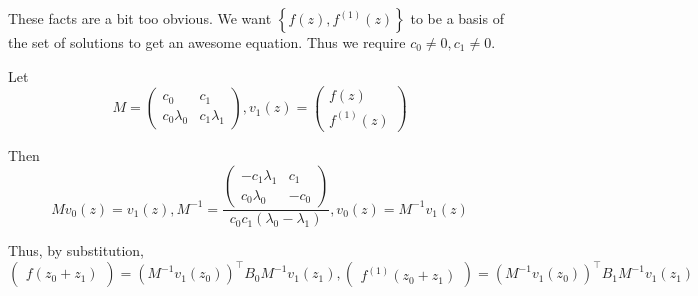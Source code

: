\documentclass[]{article}
\newcommand{\pqty}[1]{{\left(#1\right)}}
\newcommand{\Bqty}[1]{{\left\{#1\right\}}}
\numberwithin{equation}{section}
\begin{document}
	These facts are a bit too obvious. We want $\Bqty{f\pqty{z},f^\pqty{1}\pqty{z}}$ to be a basis of the set of solutions to get an awesome equation. Thus we require $c_0\neq 0,c_1\neq 0$.
	
	Let
	\begin{equation}
		M=
		\begin{pmatrix}
			c_0 & c_1 \\
			c_0 \lambda_0 & c_1 \lambda_1
		\end{pmatrix}
		,
		v_1\pqty{z}=
		\begin{pmatrix}
			f\pqty{z} \\
			f^\pqty{1}\pqty{z}
		\end{pmatrix}
	\end{equation}
	
	Then
	\begin{equation}
		M v_0\pqty{z}=v_1\pqty{z}
		,
		M^{-1}=
		\frac{\begin{pmatrix}
			-c_1 \lambda_1 & c_1 \\
			c_0 \lambda_0 & -c_0
		\end{pmatrix}}{c_0 c_1 \pqty{\lambda_0-\lambda_1}}
		,
		v_0\pqty{z}=M^{-1} v_1\pqty{z}
	\end{equation}
	
	Thus, by substitution,
	\begin{equation}
		\begin{pmatrix}
			f\pqty{z_0+z_1}
		\end{pmatrix}
		=\pqty{M^{-1} v_1\pqty{z_0}}^\top B_0 M^{-1} v_1\pqty{z_1}
		,
		\begin{pmatrix}
			f^\pqty{1}\pqty{z_0+z_1}
		\end{pmatrix}
		=\pqty{M^{-1} v_1\pqty{z_0}}^\top B_1 M^{-1} v_1\pqty{z_1}
	\end{equation}
	
\end{document}
